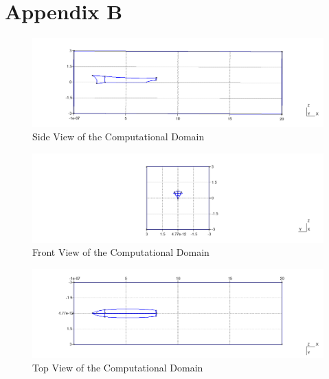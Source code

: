 \documentclass[12pt]{article} %
\begin{document}
\clearpage
\section{Appendix B}
\begin{figure}[ht]
    \centering
    \includegraphics[width=1\textwidth]{domain_1.png}
    \caption{Side View of the Computational Domain}
\end{figure}
\begin{figure}[ht]
    \centering
    \includegraphics[width=1\textwidth]{domain_2.png}
    \caption{Front View of the Computational Domain}
\end{figure}
\begin{figure}[ht]
    \centering
    \includegraphics[width=1\textwidth]{domain_3.png}
    \caption{Top View of the Computational Domain}
\end{figure}

\clearpage
\end{document}
